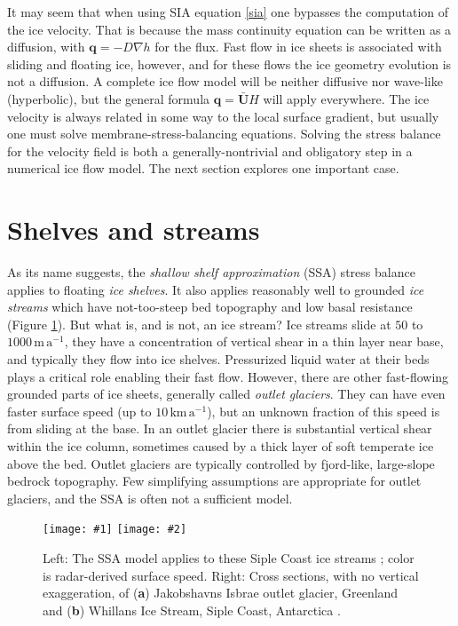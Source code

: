 \documentclass[letterpaper,final,12pt,reqno]{amsart}
\newcommand{\bq}{\mathbf{q}}
\newcommand{\bU}{\mathbf{U}}
\newcommand{\twofigsizes}[5]{
\begin{figure}[ht]
\centering
\texttt{[image: \#1]} \quad
\texttt{[image: \#2]}
\caption{#3}
\label{fig:#1}
\end{figure}}
\begin{document}
It may seem that when using SIA equation \eqref{sia} one bypasses the computation of the ice velocity.  That is because the mass continuity equation can be written as a diffusion, with $\bq=-D\nabla h$ for the flux.  Fast flow in ice sheets is associated with sliding and floating ice, however, and for these flows the ice geometry evolution is not a diffusion.  A complete ice flow model will be neither diffusive nor wave-like (hyperbolic), but the general formula $\bq = \bar{\bU} H$ will apply everywhere.  The ice velocity is always related in some way to the local surface gradient, but usually one must solve membrane-stress-balancing equations.  Solving the stress balance for the velocity field is both a generally-nontrivial and obligatory step in a numerical ice flow model.  The next section explores one important case.


\section{Shelves and streams}  \label{sec:shelvesandstreams}

As its name suggests, the \emph{shallow shelf approximation} (SSA) stress balance applies to floating \emph{ice shelves}.  It also applies reasonably well to grounded \emph{ice streams} which have not-too-steep bed topography and low basal resistance (Figure \ref{fig:siple}).  But what is, and is not, an ice stream?  Ice streams slide at $50$ to $1000 \,\text{m}\,\text{a}^{-1}$, they have a concentration of vertical shear in a thin layer near base, and typically they flow into ice shelves.  Pressurized liquid water at their beds plays a critical role enabling their fast flow.  However, there are other fast-flowing grounded parts of ice sheets,  generally called \emph{outlet glaciers}.  They can have even faster surface speed (up to $10 \,\text{km}\,\text{a}^{-1}$), but an unknown fraction of this speed is from sliding at the base.  In an outlet glacier there is substantial vertical shear within the ice column, sometimes caused by a thick layer of soft temperate ice above the bed.  Outlet glaciers are typically controlled by fjord-like, large-slope bedrock topography.  Few simplifying assumptions are appropriate for outlet glaciers, and the SSA is often not a sufficient model.

\twofigsizes{siple}{streamisbrae}{Left:  The SSA model applies to these Siple Coast ice streams \cite{Joughinetal2002}; color is radar-derived surface speed.  Right: Cross sections, with no vertical exaggeration, of (\textbf{a}) Jakobshavns Isbrae outlet glacier, Greenland and (\textbf{b}) Whillans Ice Stream, Siple Coast, Antarctica \cite{TrufferEchelmeyer}.}{2.8in}{2.9in}
\end{document}
